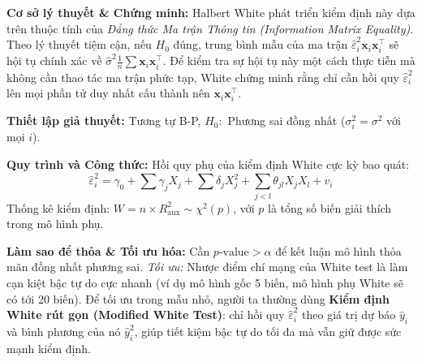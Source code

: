 	\textbf{Cơ sở lý thuyết \& Chứng minh:} Halbert White \cite{white1980} phát triển kiểm định này dựa trên thuộc tính của \textit{Đẳng thức Ma trận Thông tin (Information Matrix Equality)}. Theo lý thuyết tiệm cận, nếu $H_0$ đúng, trung bình mẫu của ma trận $\hat{\varepsilon}_i^2 \mathbf{x}_i \mathbf{x}_i^\top$ sẽ hội tụ chính xác về $\hat{\sigma}^2 \frac{1}{n}\sum \mathbf{x}_i \mathbf{x}_i^\top$. Để kiểm tra sự hội tụ này một cách thực tiễn mà không cần thao tác ma trận phức tạp, White chứng minh rằng chỉ cần hồi quy $\hat{\varepsilon}_i^2$ lên mọi phần tử duy nhất cấu thành nên $\mathbf{x}_i \mathbf{x}_i^\top$.
	
	\textbf{Thiết lập giả thuyết:} Tương tự B-P, $H_0:$ Phương sai đồng nhất ($\sigma_i^2 = \sigma^2$ với mọi $i$).
	
	\textbf{Quy trình và Công thức:}
	Hồi quy phụ của kiểm định White cực kỳ bao quát:
	\begin{equation}
		\hat{\varepsilon}_i^2 = \gamma_0 + \sum \gamma_j X_j + \sum \delta_j X_j^2 + \sum_{j<l} \theta_{jl} X_j X_l + v_i
	\end{equation}
	Thống kê kiểm định: $W = n \times R^2_{\text{aux}} \sim \chi^2(p)$, với $p$ là tổng số biến giải thích trong mô hình phụ.
	
	\textbf{Làm sao để thỏa \& Tối ưu hóa:} Cần $p\text{-value} > \alpha$ để kết luận mô hình thỏa mãn đồng nhất phương sai. \textit{Tối ưu:} Nhược điểm chí mạng của White test là làm cạn kiệt bậc tự do cực nhanh (ví dụ mô hình gốc 5 biến, mô hình phụ White sẽ có tới 20 biến). Để tối ưu trong mẫu nhỏ, người ta thường dùng \textbf{Kiểm định White rút gọn (Modified White Test)}: chỉ hồi quy $\hat{\varepsilon}_i^2$ theo giá trị dự báo $\hat{y}_i$ và bình phương của nó $\hat{y}_i^2$, giúp tiết kiệm bậc tự do tối đa mà vẫn giữ được sức mạnh kiểm định.
